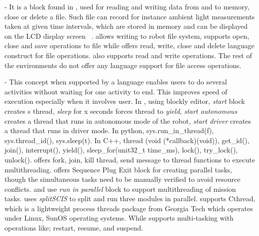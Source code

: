  - It is a block found in \lego, used for reading and writing data from and to memory, close or delete a file. Such file can record for instance ambient light measurements taken at given time intervals, which are stored in memory and can be displayed on the LCD display screen ~\cite{LEGO}. \trik allows writing to robot file system, \choregraphe supports open, close and save operations to file while \missionlab offers read, write, close and delete language construct for file operations. \picaxe also supports read and write operations. The rest of the environments do not offer any language support for file access operations.

 - This concept when supported by a language enables users to do several activities without waiting for one activity to end. This improves speed of execution especially when it involves user. In \robotmesh,  using blockly editor,  \textit{start} block creates s thread, \textit{sleep} for x seconds forces thread to \textit{yield}, \textit{start autonomous} creates a thread that runs in autonomous mode of the robot, \textit{start driver} creates a thread that runs in driver mode. In python, sys.run\_in\_thread(f), sys.thread\_id(), sys.sleep(t). In C++, thread (void (*callback)(void)), get\_id(), join(), interrupt(), yield(), sleep\_for(unit32\_t time\_ms), lock(), try\_lock(), unlock(). \trik offers fork, join, kill thread, send message to thread functions to execute multithreading. \lego offers Sequence Plug Exit block for creating parallel tasks, though the simultaneous tasks need to be manually verified to avoid resource conflicts. \makecode and \robotc use \textit{run in parallel} block to support multithreading of mission tasks. \tivipe uses \textit{splitSCIS} to split and run three modules  in parallel. \missionlab supports Cthread, which is a lightweight process threads package from Georgia Tech which operates under Linux, SunOS operating systems. While \picaxe supports multi-tasking with operations like; restart, resume, and suspend.












